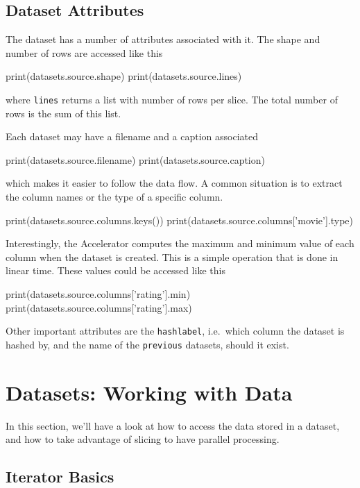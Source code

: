 \documentclass[a4paper]{article}
\begin{document}
\clearpage


\subsection{Dataset Attributes}
The dataset has a number of attributes associated with it.  The shape
and number of rows are accessed like this
\begin{python}
  print(datasets.source.shape)
  print(datasets.source.lines)
\end{python}
where \texttt{lines} returns a list with number of rows per slice.
The total number of rows is the sum of this list.

Each dataset may have a filename and a caption associated
\begin{python}
  print(datasets.source.filename)
  print(datasets.source.caption)
\end{python}
which makes it easier to follow the data flow.  A common situation is
to extract the column names or the type of a specific column.
\begin{python}
  print(datasets.source.columns.keys())
  print(datasets.source.columns['movie'].type)
\end{python}

Interestingly, the Accelerator computes the maximum and minimum value
of each column when the dataset is created.  This is a simple
operation that is done in linear time.  These values could be accessed
like this
\begin{python}
  print(datasets.source.columns['rating'].min)
  print(datasets.source.columns['rating'].max)
\end{python}

Other important attributes are the \texttt{hashlabel}, i.e.\ which
column the dataset is hashed by, and the name of the \texttt{previous}
datasets, should it exist.

\clearpage




\section{Datasets: Working with Data}

In this section, we'll have a look at how to access the data stored in
a dataset, and how to take advantage of slicing to have parallel
processing.

\subsection{Iterator Basics}
\end{document}
